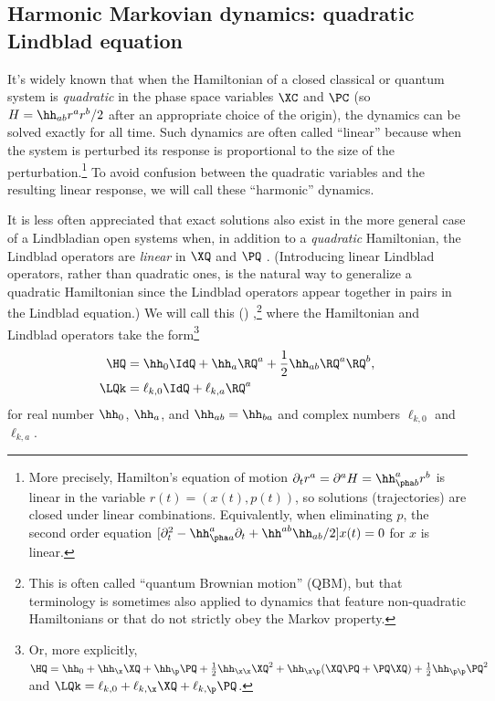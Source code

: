 \documentclass{article}
\numberwithin{equation}{section}
\begin{document}
\subsection{Harmonic Markovian dynamics: quadratic Lindblad equation}\label{sec:harmonic-dynamics}




It's widely known that when the Hamiltonian of a closed classical or quantum system is \emph{quadratic} in the phase space variables $\XC$ and $\PC$ (so $H = \hh_{ab}r^a r^b/2$ after an appropriate choice of the origin), the dynamics can be solved exactly for all time.  Such dynamics are often called ``linear'' because when the system is perturbed its response is proportional to the size of the perturbation.\footnote{More precisely, Hamilton's equation of motion $\partial_t r^a = \partial^a H = \hh^{a}_{\pha b} r^b$ is linear in the variable $r(t) = (x(t),p(t))$, so solutions (trajectories) are closed under linear combinations.  Equivalently, when eliminating $p$, the second order equation $[\partial_t^2 - \hh^{a}_{\pha a} \partial_t + \hh^{ab}\hh_{ab}/2]x(t)=0$ for $x$ is linear.}  To avoid confusion between the quadratic variables and the resulting linear response, we will call these ``harmonic'' dynamics.

It is less often appreciated that exact solutions also exist in the more general case of a Lindbladian open systems when, in addition to a \emph{quadratic} Hamiltonian, the Lindblad operators are \emph{linear} in $\XQ$ and $\PQ$ \cite{lindblad1976brownian, isar1994open, Riedel_MO_QBM}. (Introducing linear Lindblad operators, rather than quadratic ones,  is the natural way to generalize a quadratic Hamiltonian since the Lindblad operators appear together in pairs in the Lindblad equation.) We will call this  () ,\footnote{This is often called ``quantum Brownian motion'' (QBM), but that terminology is sometimes also applied to dynamics that feature non-quadratic Hamiltonians or that do not strictly obey the Markov property.} where the Hamiltonian and Lindblad operators take the form\footnote{Or, more explicitly, $\HQ = \hh_0 + \hh_\x \XQ + \hh_\p \PQ + \frac{1}{2} \hh_{\x\x} \XQ^2 + \hh_{\x\p} (\XQ \PQ+\PQ \XQ) +  \frac{1}{2} \hh_{\p\p} \PQ^2$ and $\LQk = \ell_{k,0} + \ell_{k,\x} \XQ + \ell_{k,\p} \PQ$.}
\begin{align}
	\label{eq:linear-operators}
	\HQ &= \hh_0 \IdQ + \hh_a \RQ^a + \frac{1}{2} \hh_{ab} \RQ^a\RQ^b,\\
 \label{eq:linear-lindblad}
	\LQk &= \ell_{k,0} \IdQ + \ell_{k,a} \RQ^a 
\end{align}
for real number $\hh_{0}$, $\hh_{a}$, and $\hh_{ab} = \hh_{ba}$ and complex numbers $\ell_{k,0}$ and $\ell_{k,a}$. 
\end{document}
